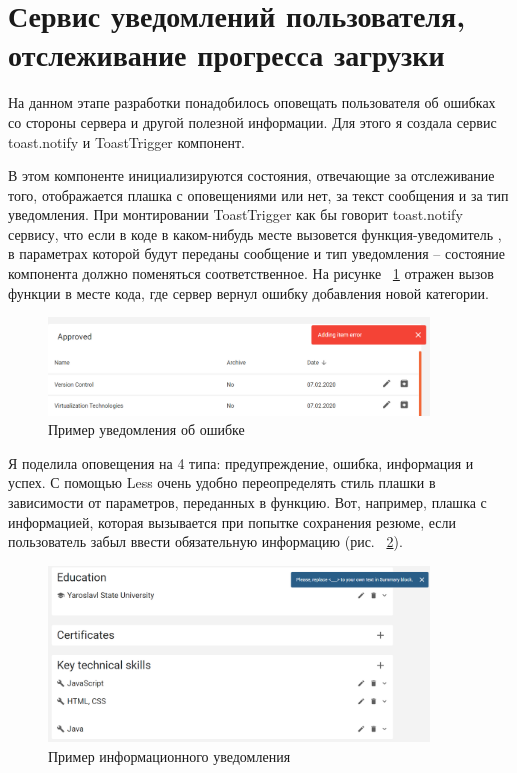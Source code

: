 \documentclass[a4paper,12pt]{diplom}
\begin{document}
\section{Сервис уведомлений пользователя, отслеживание прогресса загрузки}

На данном этапе разработки понадобилось оповещать пользователя об ошибках со стороны сервера и другой полезной информации.
Для этого я создала сервис toast.notify и ToastTrigger компонент.

В этом компоненте инициализируются состояния, отвечающие за отслеживание того, отображается плашка с оповещениями или нет, за текст сообщения и за тип уведомления.
При монтировании ToastTrigger как бы говорит toast.notify сервису, что если в коде в каком-нибудь месте вызовется функция-уведомитель
, в параметрах которой будут переданы сообщение и тип уведомления -- состояние
компонента должно поменяться соответственное. На рисунке ~\ref{4} отражен вызов функции в месте кода, где сервер вернул ошибку добавления новой категории.

\begin{figure}[!ht]
	\centering
	\includegraphics[width=0.9\textwidth]{resources/toasterror.png}
	\caption{Пример уведомления об ошибке}
	\label{4}
\end{figure}

Я поделила оповещения на 4 типа: предупреждение, ошибка, информация и успех. С помощью 
Less очень удобно переопределять стиль плашки в зависимости от параметров, переданных в 
функцию. Вот, например, плашка с информацией, которая вызывается при попытке сохранения резюме, если пользователь 
забыл ввести обязательную информацию (рис. ~\ref{5}).

\begin{figure}[!ht]
	\centering
	\includegraphics[width=0.9\textwidth]{resources/toast.png}
	\caption{Пример информационного уведомления}
	\label{5}
\end{figure}
\end{document}
